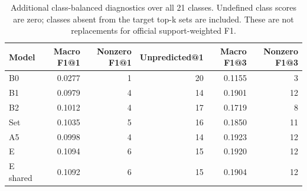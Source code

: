 \begin{table}[!htbp]
\centering
\footnotesize
\setlength{\tabcolsep}{5pt}
\begin{tabular}{lrrrrr}
\toprule
Model & Macro F1@1 & Nonzero F1@1 & Unpredicted@1 & Macro F1@3 & Nonzero F1@3 \\
\midrule
B0 & 0.0277 & 1 & 20 & 0.1155 & 3 \\
B1 & 0.0979 & 4 & 14 & 0.1901 & 12 \\
B2 & 0.1012 & 4 & 17 & 0.1719 & 8 \\
Set & 0.1035 & 5 & 16 & 0.1850 & 11 \\
A5 & 0.0998 & 4 & 14 & 0.1923 & 12 \\
E & 0.1094 & 6 & 15 & 0.1920 & 12 \\
E shared & 0.1092 & 6 & 15 & 0.1904 & 12 \\
\bottomrule
\end{tabular}
\caption{Additional class-balanced diagnostics over all 21 classes. Undefined class scores are zero; classes absent from the target top-k sets are included. These are not replacements for official support-weighted F1.}
\label{tab:rare}
\end{table}
